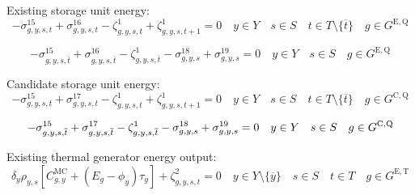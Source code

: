 \documentclass{article}
\newcommand{\sGeneratorsExistingThermal}{G^{\mathrm{E,T}}}
\newcommand{\sStorageExisting}{G^{\mathrm{E,Q}}}
\newcommand{\sStorageCandidate}{G^{\mathrm{C,Q}}}
\newcommand{\sYears}{Y}
\newcommand{\sScenarios}{S}
\newcommand{\sIntervals}{T}
\newcommand{\iGenerator}{g}
\newcommand{\iYear}{y}
\newcommand{\iYearTerminal}{\overline{\iYear}}
\newcommand{\iScenario}{s}
\newcommand{\iInterval}{t}
\newcommand{\iIntervalTerminal}{\overline{\iInterval}}
\newcommand{\cScenarioDuration}[1][\iYear,\iScenario]{\rho_{#1}}
\newcommand{\cMarginalCost}[1][\iGenerator,\iYear]{C^{\mathrm{MC}}_{#1}}
\newcommand{\cEmissionsIntensity}[1][\iGenerator]{E_{#1}}
\newcommand{\cDiscountRate}[1][\iYear]{\delta_{#1}}
\newcommand{\vBaseline}[1][\iYear]{\phi_{#1}}
\newcommand{\vPermitPrice}[1][\iYear]{\tau_{#1}}
\newcommand{\dNonNegativeStorageEnergy}[1][\iGenerator,\iYear,\iScenario,\iInterval]{\sigma_{#1}^{15}}
\newcommand{\dMaxStorageEnergyExisting}[1][\iGenerator,\iYear,\iScenario,\iInterval]{\sigma_{#1}^{16}}
\newcommand{\dMaxStorageEnergyCandidate}[1][\iGenerator,\iYear,\iScenario,\iInterval]{\sigma_{#1}^{17}}
\newcommand{\dMinStorageEnergyIntervalEnd}[1][\iGenerator,\iYear,\iScenario]{\sigma_{#1}^{18}}
\newcommand{\dMaxStorageEnergyIntervalEnd}[1][\iGenerator,\iYear,\iScenario]{\sigma_{#1}^{19}}
\newcommand{\dStorageEnergyTransition}[1][\iGenerator,\iYear,\iScenario,\iInterval]{\zeta_{#1}^{1}}
\newcommand{\dGeneratorEnergyOutput}[1][\iGenerator,\iYear,\iScenario,\iInterval]{\zeta_{#1}^{2}}
\begin{document}
Existing storage unit energy:
\begin{equation}
- \dNonNegativeStorageEnergy + \dMaxStorageEnergyExisting - \dStorageEnergyTransition + \dStorageEnergyTransition[\iGenerator,\iYear,\iScenario,\iInterval+1] = 0 \quad \iYear \in \sYears \quad \iScenario \in \sScenarios \quad \iInterval \in \sIntervals \setminus \{\iIntervalTerminal\} \quad \iGenerator \in \sStorageExisting
\end{equation}

\begin{equation}
- \dNonNegativeStorageEnergy[\iGenerator,\iYear,\iScenario,\iIntervalTerminal] + \dMaxStorageEnergyExisting[\iGenerator,\iYear,\iScenario,\iIntervalTerminal] - \dStorageEnergyTransition[\iGenerator,\iYear,\iScenario,\iIntervalTerminal] - \dMinStorageEnergyIntervalEnd + \dMaxStorageEnergyIntervalEnd = 0 \quad \iYear \in \sYears \quad \iScenario \in \sScenarios \quad \iGenerator \in \sStorageExisting
\end{equation}

Candidate storage unit energy:
\begin{equation}
- \dNonNegativeStorageEnergy + \dMaxStorageEnergyCandidate - \dStorageEnergyTransition + \dStorageEnergyTransition[\iGenerator,\iYear,\iScenario,\iInterval+1] = 0 \quad \iYear \in \sYears \quad \iScenario \in \sScenarios \quad \iInterval \in \sIntervals \setminus \{\iIntervalTerminal\} \quad \iGenerator \in \sStorageCandidate
\end{equation}

\begin{equation}
- \dNonNegativeStorageEnergy[\iGenerator,\iYear,\iScenario,\iIntervalTerminal] + \dMaxStorageEnergyCandidate[\iGenerator,\iYear,\iScenario,\iIntervalTerminal] - \dStorageEnergyTransition[\iGenerator,\iYear,\iScenario,\iIntervalTerminal] - \dMinStorageEnergyIntervalEnd + \dMaxStorageEnergyIntervalEnd = 0 \quad \iYear \in \sYears \quad \iScenario \in \sScenarios \quad \iGenerator \in \sStorageCandidate\\
\end{equation}

Existing thermal generator energy output:
\begin{equation}
\cDiscountRate \cScenarioDuration \left[\cMarginalCost + \left(\cEmissionsIntensity - \vBaseline\right)\vPermitPrice \right]  + \dGeneratorEnergyOutput = 0 \quad \iYear \in \sYears \setminus \{\iYearTerminal\} \quad \iScenario \in \sScenarios \quad \iInterval \in \sIntervals \quad \iGenerator \in \sGeneratorsExistingThermal
\end{equation}
\end{document}
